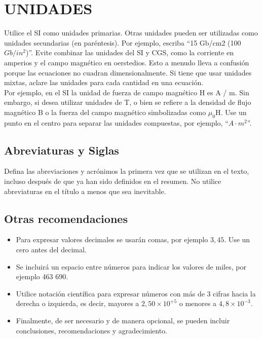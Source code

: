 \documentclass[10.5 pt, twocolumn]{article}
\begin{document}
\section{UNIDADES}

Utilice el SI como unidades primarias. Otras unidades pueden ser utilizadas como unidades secundarias (en paréntesis). Por ejemplo, escriba ``15 Gb/cm2 (100 $Gb/in^2$)''. Evite combinar las unidades del SI y CGS, como la corriente en amperios y el campo magnético en oerstedios. Esto a menudo lleva a confusión porque las ecuaciones no cuadran dimensionalmente. Si tiene que usar unidades mixtas, aclare las unidades para cada cantidad en una ecuación.\\

Por ejemplo, en el SI la unidad de fuerza de campo magnético H es A / m. Sin embargo, si desea utilizar unidades de T, o bien se refiere a la densidad de flujo magnético B o la fuerza del campo magnético simbolizadas como $\mu_0$H. Use un punto en el centro para separar las unidades compuestas, por ejemplo, ``$A\cdot m^2$''.
\subsection{Abreviaturas y Siglas}

Defina las abreviaciones y acrónimos la primera vez que se utilizan en el texto, incluso después de que ya han sido definidos en el resumen. No utilice abreviaturas en el título a menos que sea inevitable.

\subsection{Otras recomendaciones}

\begin{itemize}
\item 	Para expresar valores decimales se usarán comas, por ejemplo $3,45$. Use un cero antes del decimal.
\item 	Se incluirá un espacio entre números para indicar los valores de miles, por ejemplo 463 690.
\item Utilice notación científica para expresar números con más de 3 cifras hacia la derecha o izquierda, es decir, mayores a $2,50\times 10^{+5}$ o menores a $4,8\times 10^{-3}.$
\item Finalmente, de ser necesario y de manera opcional, se pueden incluir conclusiones, recomendaciones y agradecimiento.
\end{itemize}
\end{document}

